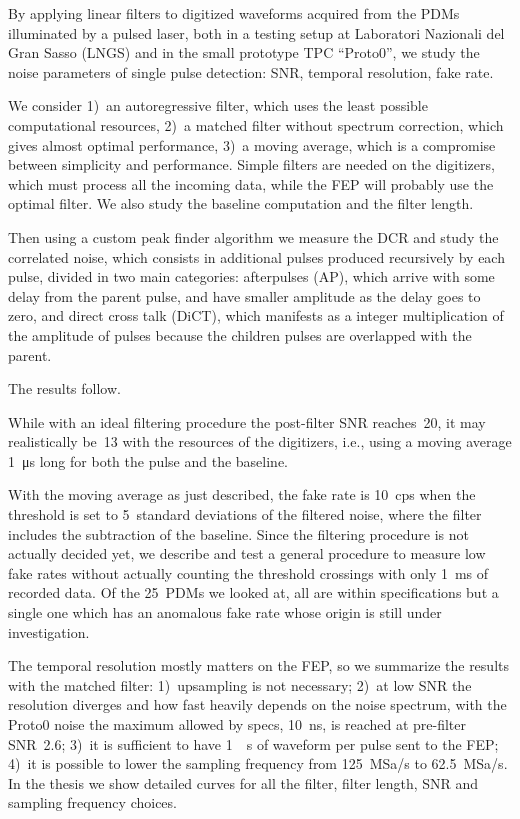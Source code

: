 \documentclass[11pt]{article}
\begin{document}
    By applying linear filters to digitized waveforms acquired from the PDMs
    illuminated by a pulsed laser, both in a testing setup at Laboratori
    Nazionali del Gran Sasso (LNGS) and in the small prototype TPC ``Proto0'',
    we study the noise parameters of single pulse detection: SNR, temporal
    resolution, fake rate.
    
    We consider 1)~an autoregressive filter, which uses the least possible
    computational resources, 2)~a matched filter without spectrum correction,
    which gives almost optimal performance, 3)~a moving average, which is a
    compromise between simplicity and performance. Simple filters are needed on
    the digitizers, which must process all the incoming data, while the FEP
    will probably use the optimal filter. We also study the baseline
    computation and the filter length.
    
    Then using a custom peak finder algorithm we measure the DCR and study the
    correlated noise, which consists in additional pulses produced recursively
    by each pulse, divided in two main categories: afterpulses (AP), which
    arrive with some delay from the parent pulse, and have smaller amplitude as
    the delay goes to zero, and direct cross talk (DiCT), which manifests as a
    integer multiplication of the amplitude of pulses because the children
    pulses are overlapped with the parent.
    
    The results follow.
    
    While with an ideal filtering procedure the post-filter SNR reaches~20, it
    may realistically be~13 with the resources of the digitizers, i.e., using a
    moving average \SI{1}{\micro s} long for both the pulse and the baseline.
    
    With the moving average as just described, the fake rate is \SI{10}{cps}
    when the threshold is set to 5~standard deviations of the filtered noise,
    where the filter includes the subtraction of the baseline. Since the
    filtering procedure is not actually decided yet, we describe and test a
    general procedure to measure low fake rates without actually counting the
    threshold crossings with only \SI{1}{ms} of recorded data. Of the 25~PDMs
    we looked at, all are within specifications but a single one which has an
    anomalous fake rate whose origin is still under investigation.

    The temporal resolution mostly matters on the FEP, so we summarize the
    results with the matched filter: 1)~upsampling is not necessary; 2)~at low
    SNR the resolution diverges and how fast heavily depends on the noise
    spectrum, with the Proto0 noise the maximum allowed by specs, \SI{10}{ns},
    is reached at pre-filter SNR~2.6; 3)~it is sufficient to have \SI{1}{\micro
    s} of waveform per pulse sent to the FEP; 4)~it is possible to lower the
    sampling frequency from \SI{125}{MSa/s} to \SI{62.5}{MSa/s}. In the thesis
    we show detailed curves for all the filter, filter length, SNR and sampling
    frequency choices.
    
\end{document}
